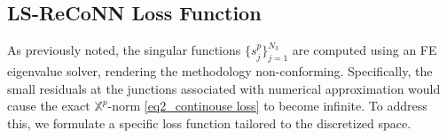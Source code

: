 \documentclass[oneside]{article}
\newcounter{reviewer}
\newcounter{point}[reviewer]
\begin{document}


% 	


\vspace{-.5cm}
\subsection{LS-ReCoNN Loss Function}\label{LS-ReCoNN Loss Function}
As previously noted, the singular functions $\{s_j^p\}_{j=1}^{N_3}$ are computed using an FE eigenvalue solver, rendering the methodology non-conforming.  Specifically, the small residuals at the junctions associated with numerical approximation would cause the exact $\mathbb{X}^p$-norm \eqref{eq2_continouse loss} to become infinite. To address this, we formulate a specific loss function tailored to the discretized space.
\end{document}
